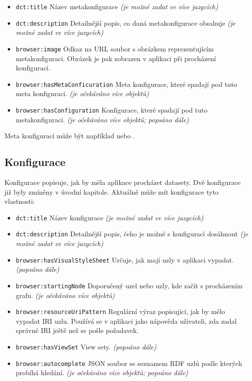 \begin{itemize}
    \item \texttt{dct:title} Název metakonfigurace \textit{(je možné zadat ve více jazycích)}
    \item \texttt{dct:description} Detailnější popis, co daná metakonfigurace obsahuje \textit{(je možné zadat ve více jazycích)}
    \item \texttt{browser:image} Odkaz na URL soubor s obrázkem reprezentujícím metakonfiguraci. Obrázek je pak zobrazen v aplikaci při procházení konfigurací.
    \item \texttt{browser:hasMetaConficuration} Meta konfigurace, které spadají pod tuto meta konfiguraci. \textit{(je očekáváno více objektů)}
    \item \texttt{browser:hasConfiguration} Konfigurace, které spadají pod tuto metakonfiguraci. \textit{(je očekáváno více objektů; popsáno dále)}
\end{itemize}

Meta konfigurací může být například  nebo .

\subsection{Konfigurace} \label{pozadavky-konfigurace}
Konfigurace popisuje, jak by měla aplikace procházet datasety. Dvě konfigurace již byly zmíněny v úvodní kapitole. Aktuálně může mít konfigurace tyto vlastnosti:

\begin{itemize}
    \item \texttt{dct:title} Název konfigurace \textit{(je možné zadat ve více jazycích)}
    \item \texttt{dct:description} Detailnější popis, čeho je možné s konfigurací dosáhnout \textit{(je možné zadat ve více jazycích)}
    \item \texttt{browser:hasVisualStyleSheet} Určuje, jak mají uzly v aplikaci vypadat. \textit{(popsáno dále)}
    \item \texttt{browser:startingNode} Doporučený uzel nebo uzly, kde začít s procházením grafu. \textit{(je očekáváno více objektů)}
    \item \texttt{browser:resourceUriPattern} Regulární výraz popisující, jak by mělo vypadat IRI uzlu. Používá se v aplikaci jako nápověda uživateli, zda zadal správné IRI ještě než se pošle požadavek.
    \item \texttt{browser:hasViewSet} View sety. \textit{(popsáno dále)}
    \item \texttt{browser:autocomplete} JSON soubor se seznamem RDF uzlů podle kterých probíhá hledání. \textit{(je očekáváno více objektů; popsáno dále)}
\end{itemize}

